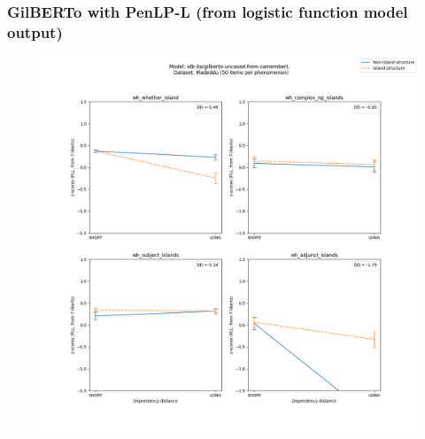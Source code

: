 \subsubsection{GilBERTo with PenLP-L (from logistic function model output)}
\begin{figure}[h]
	\centering
	\includegraphics[width=1\textwidth]{images/Chapter1/Madeddu_wh_idb-ita_gilberto-uncased-from-camembert_PLL-zscores-likert-2022-07-11.png} 
\end{figure}

\clearpage
